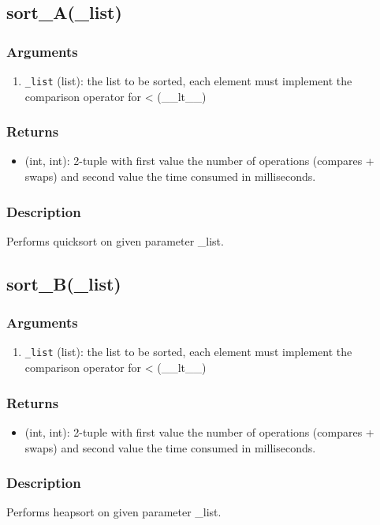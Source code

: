 \subsection{sort\_A(\_list)}
\subsubsection*{Arguments}
\begin{enumerate}
    \item \texttt{\_list} (list): the list to be sorted, each element must implement the comparison operator for < (\_\_lt\_\_)
\end{enumerate}
\subsubsection*{Returns}
\begin{itemize}
    \item (int, int): 2-tuple with first value the number of operations (compares + swaps) and second value the time consumed in milliseconds.
\end{itemize}
\subsubsection*{Description}
Performs quicksort on given parameter \_list.
\subsection{sort\_B(\_list)}
\subsubsection*{Arguments}
\begin{enumerate}
    \item \texttt{\_list} (list): the list to be sorted, each element must implement the comparison operator for < (\_\_lt\_\_)
\end{enumerate}
\subsubsection*{Returns}
\begin{itemize}
    \item (int, int): 2-tuple with first value the number of operations (compares + swaps) and second value the time consumed in milliseconds.
\end{itemize}
\subsubsection*{Description}
Performs heapsort on given parameter \_list.

